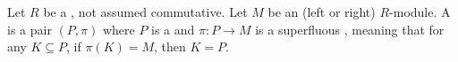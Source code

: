 \begin{definition} \label{definition:projective_cover_of_a_module_over_a_ring}
    Let $R$ be a , not assumed commutative. Let $M$ be an (left or right) $R$-module. 
    A  is a pair $(P, \pi)$ where $P$ is a  and $\pi: P \to M$ is a superfluous , meaning that for any  $K \subseteq P$, if $\pi(K) = M$, then $K = P$.
\end{definition}